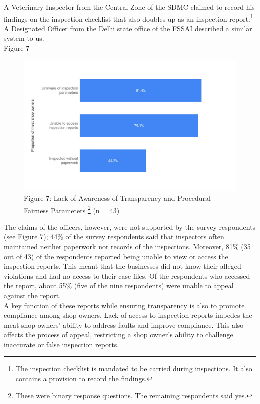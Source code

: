 \documentclass[a4paper, 12pt]{article}
\begin{document}
A Veterinary Inspector from the Central Zone of the SDMC claimed to record his findings on the inspection checklist that also doubles up as an inspection report.\footnote{The inspection checklist is mandated to be carried during inspections. It also contains a provision to record the findings.} A Designated Officer from the Delhi state office of the FSSAI described a similar system to us.\\

Figure 7
\begin{figure}[H]
\centering
\includegraphics{Fig 7.jpg}
\caption[Optional Caption]{Figure 7: Lack of Awareness of Transparency and Procedural Fairness Parameters \footnote{ These were binary response questions. The remaining respondents said yes.} (n = 43)}
\end{figure} 

The claims of the officers, however, were not supported by the survey respondents (see Figure 7); 44\% of the survey respondents said that inspectors often maintained neither paperwork nor records of the inspections. Moreover, 81\% (35 out of 43) of the respondents reported being unable to view or access the inspection reports. This meant that the businesses did not know their alleged violations and had no access to their case files. Of the respondents who accessed the report, about 55\% (five of the nine respondents) were unable to appeal against the report. \\

A key function of these reports while ensuring transparency is also to promote compliance among shop owners. Lack of access to inspection reports impedes the meat shop owners’ ability to address faults and improve compliance. This also affects the process of appeal, restricting a shop owner’s ability to challenge inaccurate or false inspection reports.\\
\end{document}
